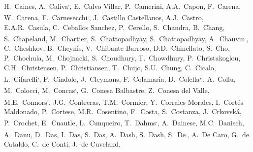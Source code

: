 \begin{flushleft}
H.~Caines\And, 
A.~Caliva\textsuperscript{,}\And, 
E.~Calvo Villar\And, 
P.~Camerini\And, 
A.A.~Capon\And, 
F.~Carena\And, 
W.~Carena\And, 
F.~Carnesecchi\textsuperscript{,}\And, 
J.~Castillo Castellanos\And, 
A.J.~Castro\And, 
E.A.R.~Casula\And, 
C.~Ceballos Sanchez\And, 
P.~Cerello\And, 
S.~Chandra\And, 
B.~Chang\And, 
S.~Chapeland\And, 
M.~Chartier\And, 
S.~Chattopadhyay\And, 
S.~Chattopadhyay\And, 
A.~Chauvin\textsuperscript{,}\And, 
C.~Cheshkov\And, 
B.~Cheynis\And, 
V.~Chibante Barroso\And, 
D.D.~Chinellato\And, 
S.~Cho\And, 
P.~Chochula\And, 
M.~Chojnacki\And, 
S.~Choudhury\And, 
T.~Chowdhury\And, 
P.~Christakoglou\And, 
C.H.~Christensen\And, 
P.~Christiansen\And, 
T.~Chujo\And, 
S.U.~Chung\And, 
C.~Cicalo\And, 
L.~Cifarelli\textsuperscript{,}\And, 
F.~Cindolo\And, 
J.~Cleymans\And, 
F.~Colamaria\And, 
D.~Colella\textsuperscript{,}\textsuperscript{,}\And, 
A.~Collu\And, 
M.~Colocci\And, 
M.~Concas\textsuperscript{,}\And, 
G.~Conesa Balbastre\And, 
Z.~Conesa del Valle\And, 
M.E.~Connors\textsuperscript{,}\And, 
J.G.~Contreras\And, 
T.M.~Cormier\And, 
Y.~Corrales Morales\And, 
I.~Cort\'{e}s Maldonado\And, 
P.~Cortese\And, 
M.R.~Cosentino\And, 
F.~Costa\And, 
S.~Costanza\And, 
J.~Crkovsk\'{a}\And, 
P.~Crochet\And, 
E.~Cuautle\And, 
L.~Cunqueiro\And, 
T.~Dahms\textsuperscript{,}\And, 
A.~Dainese\And, 
M.C.~Danisch\And, 
A.~Danu\And, 
D.~Das\And, 
I.~Das\And, 
S.~Das\And, 
A.~Dash\And, 
S.~Dash\And, 
S.~De\textsuperscript{,}\And, 
A.~De Caro\And, 
G.~de Cataldo\And, 
C.~de Conti\And, 
J.~de Cuveland\And, 

\end{flushleft}
